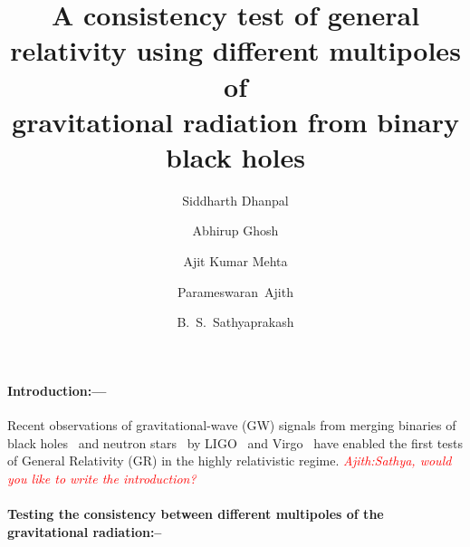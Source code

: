 \documentclass[prl,preprintnumbers,twocolumn,eqsecnum,floatfix,a4paper,nofootinbib,superscriptaddress]{revtex4}
\newcommand{\ajith}[1]{\textcolor{red}{\textit{Ajith:#1}}}
\begin{document}
\title{A consistency test of general relativity using different multipoles of \\gravitational radiation from binary black holes}
\author{Siddharth Dhanpal}
\author{Abhirup Ghosh}
\author{Ajit Kumar Mehta}
\author{Parameswaran~Ajith}
\author{B.~S.~Sathyaprakash}

\begin{abstract}
\end{abstract}
\maketitle
\paragraph{Introduction:---}

Recent observations of gravitational-wave (GW) signals from merging binaries of black holes~\cite{gw150914, gw151226, gw170104, gw170814} and neutron stars~\cite{gw170817} by LIGO~\cite{advancedLIGO-2015} and Virgo~\cite{advancedVIRGO-2015} have enabled the first tests of General Relativity (GR) in the highly relativistic regime. \ajith{Sathya, would you like to write the introduction?}

\paragraph{Testing the consistency between different multipoles of the gravitational radiation:--}
\end{document}
